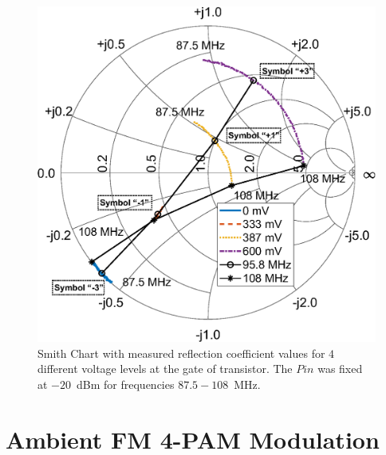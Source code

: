 \documentclass[journal]{IEEEtran}
\begin{document}
\begin{figure}[t]
\centering
\includegraphics[width=0.75\columnwidth]{Figures/Fig6.eps}
\caption{Smith Chart with measured reflection coefficient values for $4$ different voltage levels at the gate of transistor. 
The $Pin$ was fixed at $-20$~dBm for frequencies $87.5-108$~MHz.}
\label{fig:smith}
\end{figure}

\section{Ambient FM 4-PAM Modulation}
\label{Sec:PAM}
%
\end{document}
